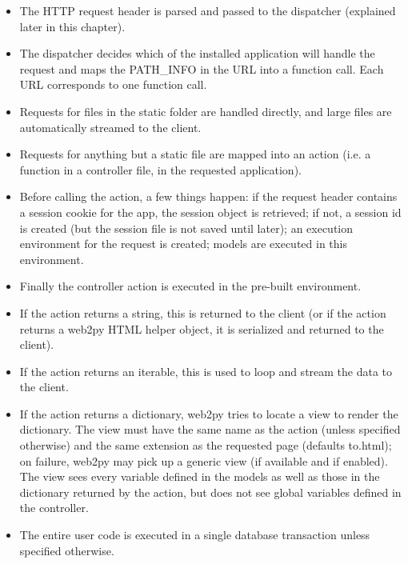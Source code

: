 \documentclass[justified,sixbynine,notoc]{tufte-book}
\begin{document}
\begin{fullwidth}
\begin{itemize}
\item The HTTP request header is parsed and passed to the dispatcher (explained later in this chapter).

\item The dispatcher decides which of the installed application will handle the request and maps the PATH\_INFO in the URL into a function call. Each URL corresponds to one function call.

\item Requests for files in the static folder are handled directly, and large files are automatically streamed to the client.

\item Requests for anything but a static file are mapped into an action (i.e. a function in a controller file, in the requested application).

\item Before calling the action, a few things happen: if the request header contains a session cookie for the app, the session object is retrieved; if not, a session id is created (but the session file is not saved until later); an execution environment for the request is created; models are executed in this environment.

\item Finally the controller action is executed in the pre-built environment.

\item If the action returns a string, this is returned to the client (or if the action returns a web2py HTML helper object, it is serialized and returned to the client).

\item If the action returns an iterable, this is used to loop and stream the data to the client.

\item If the action returns a dictionary, web2py tries to locate a view to render the dictionary. The view must have the same name as the action (unless specified otherwise) and the same extension as the requested page (defaults to.html); on failure, web2py may pick up a generic view (if available and if enabled). The view sees every variable defined in the models as well as those in the dictionary returned by the action, but does not see global variables defined in the controller.

\item The entire user code is executed in a single database transaction unless specified otherwise.


\end{itemize}
\end{fullwidth}
\end{document}
